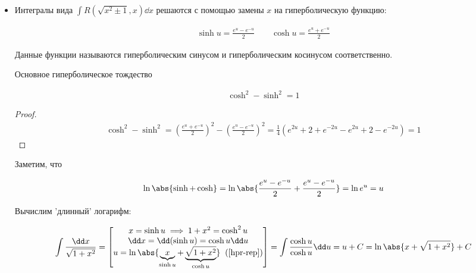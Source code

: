 
\begin{itemize}
\item Интегралы вида \(\int R(\sqrt{x^2 \pm 1}, x) \dd x\) решаются с помощью
замены \(x\) на гиперболическую функцию:

\begin{align*}
  \sinh u = \frac{e^u - e^{-u}}{2} \qquad
  \cosh u = \frac{e^u + e^{-u}}{2}
\end{align*}
\begin{remark}
  Данные функции называются гиперболическим синусом и гиперболическим косинусом
  соответственно.
\end{remark}

\begin{lemma}
  Основное гиперболическое тождество

  \begin{align*}
    \cosh^2 - \sinh^2 = 1
  \end{align*}
\end{lemma}
\begin{proof}
  \begin{align*}
    \cosh^2 - \sinh^2 =
    \left(\frac{e^{u} + e^{-u}}{2}\right)^2
      - \left(\frac{e^{u} - e^{-u}}{2}\right)^2 =
    \frac{1}{4} \left(e^{2u} + 2 + e^{-2u} - e^{2u} + 2 - e^{-2u} \right) = 1
  \end{align*}
\end{proof}

\begin{remark}\label{hpr-rep}
  Заметим, что

  \begin{align*}
    \ln \abs{\sinh + \cosh}
    = \ln \abs{\frac{e^u - e^{-u}}{2} + \frac{e^u - e^{-u}}{2}}
    = \ln e^{u}
    = u
  \end{align*}
\end{remark}

\begin{example}
  Вычислим 'длинный' логарифм:

  \begin{align*}
    \int \frac{\dd x}{\sqrt{1 + x^2}} = 
    \begin{bmatrix}
      x = \sinh u \implies 1 + x^2 = \cosh^2 u \\
      \dd x = \dd (\sinh u) = \cosh u \dd u \\
      u = \ln \abs{
        \underbrace{x}_{\sinh u} + \underbrace{\sqrt{1 + x^2}
      }_{\cosh u}} \;\; (\ref{hpr-rep})
    \end{bmatrix} =
    \int \frac{\cosh u}{\cosh u} \dd u =
    u + C =
    \ln \abs{x + \sqrt{1 + x^2}} + C
  \end{align*}
\end{example}


\end{itemize}
